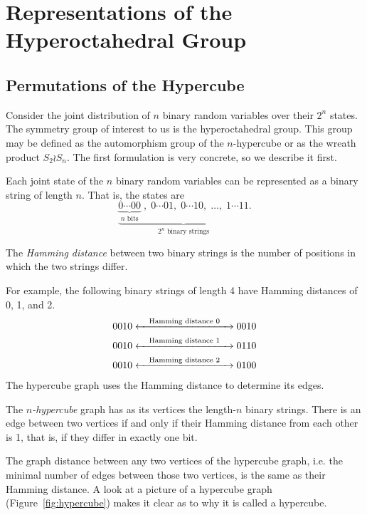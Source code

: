 \documentclass[cclicense]{hmcthesis}
\numberwithin{equation}{chapter}
\numberwithin{thmcounter}{chapter}
\begin{document}
\chapter{Representations of the Hyperoctahedral Group}

\section{Permutations of the Hypercube}

    Consider the joint distribution of $n$ binary random variables over their
    $2^n$ states.  The symmetry group of interest to us is the hyperoctahedral
    group.  This group may be defined as the automorphism group of the
    $n$-hypercube or as the wreath product $S_2 \wr S_n$.
    The first formulation is very concrete, so we describe it first. 

    Each joint state of the $n$ binary random variables can be represented as a
    binary string of length $n$.  That is, the states are
    \[
        \underbrace{
        \underbrace{0\cdots00}_\text{$n$ bits}\;,\;
        0\cdots01,\;
        0\cdots10,\;
        \ldots,\;
        1\cdots11
        }_\text{$2^n$ binary strings}.
    \]
    \begin{definition}
    The \emph{Hamming distance} between two binary strings is the number of
    positions in which the two strings differ.  
    \end{definition}
    For example, the following binary strings of length 4 have Hamming distances
    of 0, 1, and 2.
    \begin{align*}
        0010 &\xleftrightarrow{\quad\text{Hamming distance $0$}\quad} 0010 \\
        0010 &\xleftrightarrow{\quad\text{Hamming distance $1$}\quad} 0110 \\
        0010 &\xleftrightarrow{\quad\text{Hamming distance $2$}\quad} 0100
    \end{align*}
    The hypercube graph uses the Hamming distance to determine its edges.
    \begin{definition}
        The \emph{$n$-hypercube} graph has as its vertices the length-$n$ binary
        strings.  There is an edge between two vertices if and only if
        their Hamming distance from each other is 1, that is, if they differ in
        exactly one bit.
    \end{definition}
    The graph distance between any two vertices of the hypercube graph, i.e. the
    minimal number of edges between those two vertices, is the same as their
    Hamming distance.  A look at a picture of a hypercube graph
    (Figure~\ref{fig:hypercube}) makes it clear as to why it is called a
    hypercube.
\end{document}
